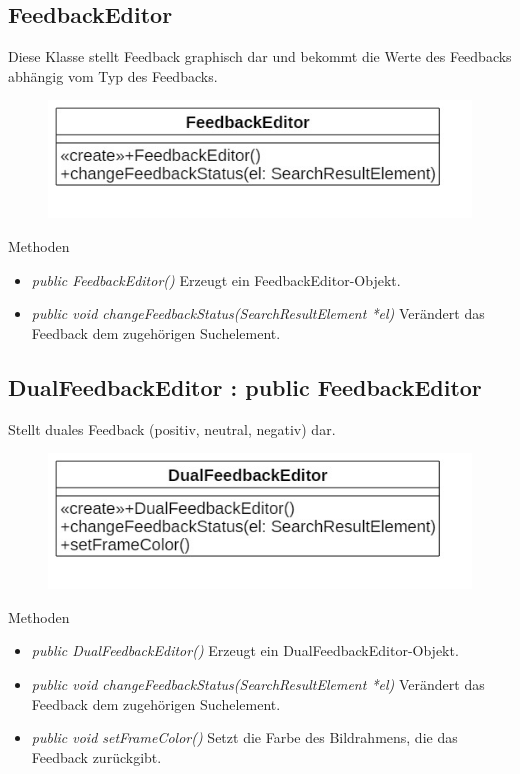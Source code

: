 \subsection*{FeedbackEditor}
Diese Klasse stellt Feedback graphisch dar und bekommt die Werte des Feedbacks abhängig vom Typ des Feedbacks.

\begin{figure}[H]
	\centering
	\includegraphics[scale=0.5]{img/Klassendiagramm/Klassen/View/FeedbackEditor}
	\label{fig:feedbackEditor}
\end{figure}

Methoden
\begin{itemize}
	\item\textit{public FeedbackEditor()}
	Erzeugt ein FeedbackEditor-Objekt.
	\item\textit{public void changeFeedbackStatus(SearchResultElement *el)}
	Verändert das Feedback dem zugehörigen Suchelement.
\end{itemize}

\subsection*{DualFeedbackEditor : public FeedbackEditor}
Stellt duales Feedback (positiv, neutral, negativ) dar.

\begin{figure}[H]
	\centering
	\includegraphics[scale=0.5]{img/Klassendiagramm/Klassen/View/DualFeedbackEditor}
	\label{fig:dualFeedbackEditor}
\end{figure}

Methoden
\begin{itemize}
	\item\textit{public DualFeedbackEditor()}
	Erzeugt ein DualFeedbackEditor-Objekt.
	\item\textit{public void changeFeedbackStatus(SearchResultElement *el)}
	Verändert das Feedback dem zugehörigen Suchelement.
	\item\textit{public void setFrameColor()}
	Setzt die Farbe des Bildrahmens, die das Feedback zurückgibt. 
\end{itemize}


